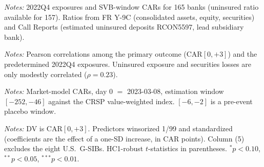 \documentclass[12pt]{article}
\begin{document}
\FloatBarrier
\newpage
\begin{table}[htbp]\centering
\begin{threeparttable}
\caption{Summary statistics}\label{tab:sumstats}\small

\begin{tablenotes}\small\item \textit{Notes:} 2022Q4 exposures and SVB-window CARs for 165
banks (uninsured ratio available for 157). Ratios from FR Y-9C (consolidated assets, equity,
securities) and Call Reports (estimated uninsured deposits RCON5597, lead subsidiary bank).
\end{tablenotes}
\end{threeparttable}
\end{table}

\begin{table}[htbp]\centering
\begin{threeparttable}
\caption{Correlation matrix}\label{tab:corr}\small

\begin{tablenotes}\small\item \textit{Notes:} Pearson correlations among the primary outcome
(CAR$[0,+3]$) and the predetermined 2022Q4 exposures. Uninsured exposure and securities losses
are only modestly correlated ($\rho=0.23$).
\end{tablenotes}
\end{threeparttable}
\end{table}

\begin{table}[htbp]\centering
\begin{threeparttable}
\caption{Cumulative abnormal returns by window}\label{tab:cars}\small

\begin{tablenotes}\small\item \textit{Notes:} Market-model CARs, day 0 $=$ 2023-03-08,
estimation window $[-252,-46]$ against the CRSP value-weighted index. $[-6,-2]$ is a pre-event
placebo window.
\end{tablenotes}
\end{threeparttable}
\end{table}

\begin{table}[htbp]\centering
\begin{threeparttable}
\caption{Cross-sectional horse race: what explains the collapse?}\label{tab:main}\small

\begin{tablenotes}\small\item \textit{Notes:} DV is CAR$[0,+3]$. Predictors winsorized 1/99
and standardized (coefficients are the effect of a one-SD increase, in CAR points).
Column (5) excludes the eight U.S.\ G-SIBs. HC1-robust $t$-statistics in parentheses.
$^{*}p<0.10$, $^{**}p<0.05$, $^{***}p<0.01$.
\end{tablenotes}
\end{threeparttable}
\end{table}
\end{document}

